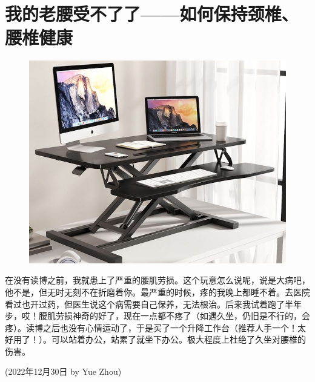 \section{我的老腰受不了了——如何保持颈椎、腰椎健康}

\begin{newminipage}[0.39]
    \begin{figure}[H]
        \includegraphics[width=0.95\columnwidth, right]{author-folder/Yue.Zhou/gongzuotai.jpg}
    \end{figure}
\end{newminipage}
\begin{newminipage}[0.6]
    在没有读博之前，我就患上了严重的腰肌劳损。这个玩意怎么说呢，说是大病吧，他不是，但无时无刻不在折磨着你。最严重的时候，疼的我晚上都睡不着。去医院看过也开过药，但医生说这个病需要自己保养，无法根治。后来我试着跑了半年步，哎！腰肌劳损神奇的好了，现在一点都不疼了（如遇久坐，仍旧是不行的，会疼）。读博之后也没有心情运动了，于是买了一个升降工作台（推荐人手一个！太好用了！）。可以站着办公，站累了就坐下办公。极大程度上杜绝了久坐对腰椎的伤害。
\end{newminipage}


\begin{flushright}
(2022年12月30日 by Yue Zhou)
\end{flushright}


